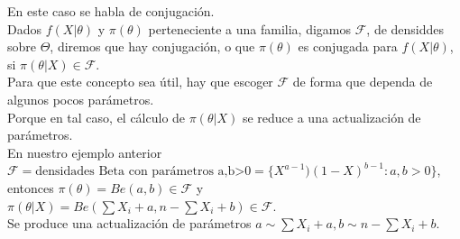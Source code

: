\documentclass[10pt]{article}
\theoremstyle{plain}
\theoremstyle{definition}
\begin{document}
En este caso se habla de conjugación.\\
Dados $f(X|\theta)$ y $\pi(\theta)$ perteneciente a una familia, digamos $\mathcal{F}$, de densiddes sobre $\Theta$, diremos que hay conjugación, o que $\pi(\theta)$ es conjugada para $f(X|\theta)$, si $\pi(\theta|X) \in \mathcal{F}$.\\

Para que este concepto sea útil, hay que escoger $\mathcal{F}$ de forma que dependa de algunos pocos parámetros.\\

Porque en tal caso, el cálculo de $\pi(\theta|X)$ se reduce a una actualización de parámetros.\\

En nuestro ejemplo anterior $\mathcal{F} = \text{densidades Beta con parámetros a,b>0} = \{X^{a-1})(1-X)^{b-1}\colon a,b>0\}$, entonces $\pi(\theta) = Be(a,b) \in \mathcal{F}$ y $\pi(\theta|X) = Be(\sum X_{i} +a, n- \sum X_{i}+b) \in \mathcal{F}$.\\

Se produce una actualización de parámetros $a\sim \sum X_{i}+a, b \sim n-\sum X_{i}+b$.\\
\end{document}
